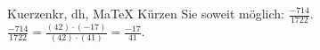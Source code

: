 \begin{MAufgabe}{Kuerzen}{kr, dh, MaTeX}
K\"urzen Sie soweit m\"oglich: $\frac{-714}{1722}$.\\ 
\ifLsg\MLoesung
\quad $\frac{-714}{1722}=\frac{(42)\cdot(-17)}{(42)\cdot(41)}=\frac{-17}{41}$.\else\relax\fi
 \end{MAufgabe}